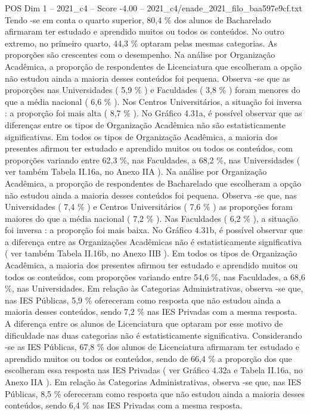 \begin{textsample}{POS Dim 1 – 2021\_c4 – Score -4.00 – 2021\_c4/enade\_2021\_filo\_baa597e9cf.txt}
Tendo -se em conta o quarto superior, 80,4 \% dos alunos de Bacharelado afirmaram ter estudado e aprendido muitos ou todos os conteúdos.
No outro extremo, no primeiro quarto, 44,3 \% optaram pelas mesmas categorias.
As proporções são crescentes com o desempenho.
Na análise por Organização Acadêmica, a proporção de respondentes de Licenciatura que escolheram a opção não estudou ainda a maioria desses conteúdos foi pequena.
Observa -se que as proporções nas Universidades ( 5,9 \% ) e Faculdades ( 3,8 \% ) foram menores do que a média nacional ( 6,6 \% ).
Nos Centros Universitários, a situação foi inversa : a proporção foi mais alta ( 8,7 \% ).
No Gráfico 4.31a, é possível observar que as diferenças entre os tipos de Organização Acadêmica não são estatisticamente significativas.
Em todos os tipos de Organização Acadêmica, a maioria dos presentes afirmou ter estudado e aprendido muitos ou todos os conteúdos, com proporções variando entre 62,3 \%, nas Faculdades, a 68,2 \%, nas Universidades ( ver também Tabela II.16a, no Anexo IIA ).
Na análise por Organização Acadêmica, a proporção de respondentes de Bacharelado que escolheram a opção não estudou ainda a maioria desses conteúdos foi pequena.
Observa -se que, nas Universidades ( 7,4 \% ) e Centros Universitários ( 7,6 \% ) as proporções foram maiores do que a média nacional ( 7,2 \% ).
Nas Faculdades ( 6,2 \% ), a situação foi inversa : a proporção foi mais baixa.
No Gráfico 4.31b, é possível observar que a diferença entre as Organizações Acadêmicas não é estatisticamente significativa ( ver também Tabela II.16b, no Anexo IIB ).
Em todos os tipos de Organização Acadêmica, a maioria dos presentes afirmou ter estudado e aprendido muitos ou todos os conteúdos, com proporções variando entre 54,6 \%, nas Faculdades, a 68,6 \%, nas Universidades.
Em relação às Categorias Administrativas, observa -se que, nas IES Públicas, 5,9 \% ofereceram como resposta que não estudou ainda a maioria desses conteúdos, sendo 7,2 \% nas IES Privadas com a mesma resposta.
A diferença entre os alunos de Licenciatura que optaram por esse motivo de dificuldade nas duas categorias não é estatisticamente significativa.
Considerando -se as IES Públicas, 67,8 \% dos alunos de Licenciatura afirmaram ter estudado e aprendido muitos ou todos os conteúdos, sendo de 66,4 \% a proporção dos que escolheram essa resposta nas IES Privadas ( ver Gráfico 4.32a e Tabela II.16a, no Anexo IIA ).
Em relação às Categorias Administrativas, observa -se que, nas IES Públicas, 8,5 \% ofereceram como resposta que não estudou ainda a maioria desses conteúdos, sendo 6,4 \% nas IES Privadas com a mesma resposta.

\end{textsample}
